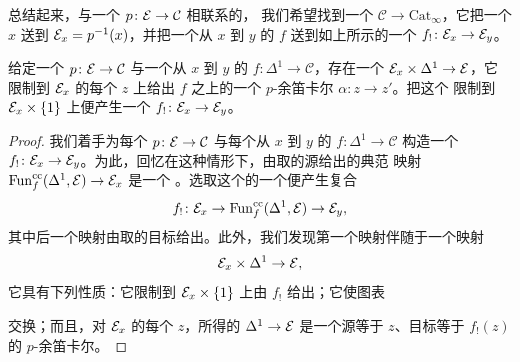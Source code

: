 总结起来，与一个\trCocartesianFibration{} $p\colon \mathcal{E} \to \mathcal{C}$ 相联系的，
我们希望找到一个\trFunctor{} $\mathcal{C} \to \mathrm{Cat}_\infty$，它把一个%
\trObject{} $x$ 送到\trFibre{} $\mathcal{E}_x = p^{-1}(x)$，并把一个从 $x$ 到 $y$ 的%
\trMorphism{} $f$ 送到如上所示的一个\trFunctor{} $f_!\colon \mathcal{E}_x \to \mathcal{E}_y$。

\begin{proposition}\label{prop:pushforward-functor}
给定一个\trCocartesianFibration{} $p\colon \mathcal{E} \to \mathcal{C}$ 与一个从 $x$ 到 $y$
的\trMorphism{} $f\colon \Delta^1 \to \mathcal{C}$，存在一个\trFunctor{}%
$\mathcal{E}_x \times \Delta^1 \to \mathcal{E}$，它限制到 $\mathcal{E}_x$ 的每个\trObject{} $z$ 上给出 $f$
之上的一个 $p$-余笛卡尔\trMorphism{} $\alpha\colon z \to z'$。把这个\trFunctor{}%
限制到 $\mathcal{E}_x \times \{1\}$ 上便产生一个\trFunctor{} $f_!\colon \mathcal{E}_x \to \mathcal{E}_y$。
\end{proposition}

\begin{proof}
我们着手为每个\trCocartesianFibration{} $p\colon \mathcal{E} \to \mathcal{C}$ 与每个从 $x$
到 $y$ 的\trMorphism{} $f\colon \Delta^1 \to \mathcal{C}$ 构造一个\trFunctor{}%
$f_!\colon \mathcal{E}_x \to \mathcal{E}_y$。为此，回忆在这种情形下，由取\trMorphism{}的源给出的典范%
映射 $\mathrm{Fun}^{\mathrm{cc}}_f(\Delta^1, \mathcal{E}) \to \mathcal{E}_x$ 是一个%
\trTrivialFibration{}。选取这个\trTrivialFibration{}的一个\trSectionMap{}便产生复合
\[
f_!\colon \mathcal{E}_x \to \mathrm{Fun}^{\mathrm{cc}}_f(\Delta^1, \mathcal{E}) \to \mathcal{E}_y,
\]
其中后一个映射由取\trMorphism{}的目标给出。此外，我们发现第一个映射伴随于一个映射
\[
\mathcal{E}_x \times \Delta^1 \to \mathcal{E},
\]
它具有下列性质：它限制到 $\mathcal{E}_x \times \{1\}$ 上由 $f_!$ 给出；它使图表
\begin{center}
\end{center}
交换；而且，对 $\mathcal{E}_x$ 的每个\trObject{} $z$，所得的\trMorphism{} $\Delta^1 \to \mathcal{E}$
是一个源等于 $z$、目标等于 $f_!(z)$ 的 $p$-余笛卡尔\trMorphism{}。
\end{proof}

